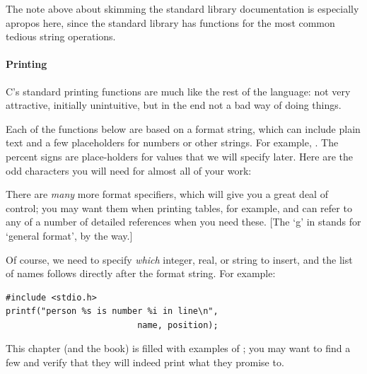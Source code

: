 \documentclass[12pt]{article}
\makeatletter
\def\ttind#1{\index{#1@\cinline{#1}}\cinline{#1}}
\makeatother
\begin{document}
The note above about skimming the standard library documentation is especially apropos here, since the
standard library has functions for the most common tedious string operations.

\paragraph{Printing}
\label{printf}
C's standard printing functions are much like the rest of the language:
not very attractive, initially unintuitive, but in the end not a bad
way of doing things.

Each of the functions below are based on a
format string, which can include plain text and a few placeholders for numbers or other strings. For
example, . The percent signs are place-holders for values that we
will specify later. Here are the odd characters you will need for almost all of your work:

\begin{center}
\end{center}

There are {\sl many} more format specifiers, which will give you a great deal of control; you may want
them when printing tables, for example, and can refer to any of a number of detailed references when you
need these. [The `g' in  stands for `general format', by the way.]

Of course, we need to specify {\sl which} integer, real, or string to insert, and the list of names
follows directly after the format string. For example:
\begin{lstlisting}
#include <stdio.h>
printf("person %s is number %i in line\n", 
                          name, position);
\end{lstlisting}
This chapter (and the book) is filled with examples of \ttind{printf}; you may want to find a few and
verify that they will indeed print what they promise to.
\end{document}
